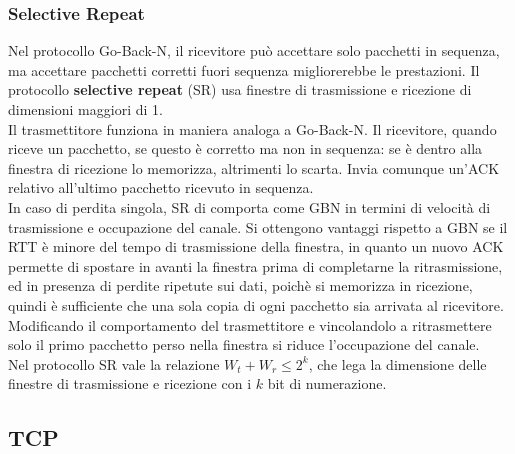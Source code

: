 \documentclass[11pt]{article}
\begin{document}
\subsubsection{Selective Repeat}
Nel protocollo Go-Back-N, il ricevitore può accettare solo pacchetti in sequenza, ma accettare pacchetti corretti fuori 
sequenza migliorerebbe le prestazioni. Il protocollo \textbf{selective repeat} (SR) usa finestre di trasmissione e ricezione
di dimensioni maggiori di 1.\\
Il trasmettitore funziona in maniera analoga a Go-Back-N. Il ricevitore, quando riceve un pacchetto, se questo è corretto 
ma non in sequenza: se è dentro alla finestra di ricezione lo memorizza, altrimenti lo scarta. Invia comunque un'ACK 
relativo all'ultimo pacchetto ricevuto in sequenza.\\
In caso di perdita singola, SR di comporta come GBN in termini di velocità di trasmissione e occupazione del canale. Si 
ottengono vantaggi rispetto a GBN se il RTT è minore del tempo di trasmissione della finestra, in quanto un nuovo ACK 
permette di spostare in avanti la finestra prima di completarne la ritrasmissione, ed in presenza di perdite ripetute sui 
dati, poichè si memorizza in ricezione, quindi è sufficiente che una sola copia di ogni pacchetto sia arrivata al ricevitore.
Modificando il comportamento del trasmettitore e vincolandolo a ritrasmettere solo il primo pacchetto perso nella finestra 
si riduce l'occupazione del canale.\\
Nel protocollo SR vale la relazione $W_t+W_r\leq 2^k$, che lega la dimensione delle finestre di trasmissione e ricezione 
con i $k$ bit di numerazione. 
\subsection{TCP}
\end{document}
